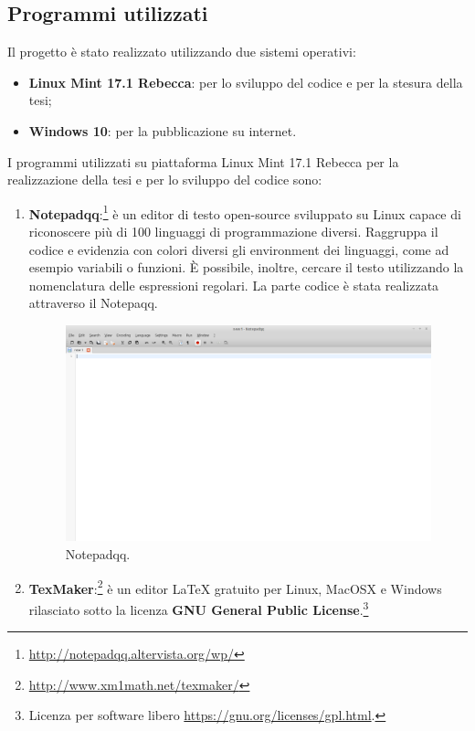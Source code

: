 \documentclass[a4paper,11pt]{article}
\begin{document}
\subsection{Programmi utilizzati}
\label{sec:6.1}
Il progetto è stato realizzato utilizzando due sistemi operativi:
\begin{itemize}
	\item \textbf{Linux Mint 17.1 Rebecca}: per lo sviluppo del codice e per la stesura della tesi;
	\item \textbf{Windows 10}: per la pubblicazione su internet.
\end{itemize}
I programmi utilizzati su piattaforma Linux Mint 17.1 Rebecca per la realizzazione della tesi e per lo sviluppo del codice sono:
\begin{enumerate}
	\item \textbf{Notepadqq}:\footnote{\url{http://notepadqq.altervista.org/wp/}} è un editor di testo open-source sviluppato su Linux capace di riconoscere più di 100 linguaggi di programmazione diversi. Raggruppa il codice e evidenzia con colori diversi gli environment dei linguaggi, come ad esempio variabili o funzioni.
È possibile, inoltre, cercare il testo utilizzando la nomenclatura delle espressioni regolari. 
La parte codice è stata realizzata attraverso il Notepaqq.
\begin{figure}[htpb]
	\centering
	\includegraphics[scale=0.30]{notepadqq.png}
	\caption{Notepadqq.}
	\label{fig:10}
\end{figure}
\newpage
		\item	\textbf{TexMaker}:\footnote{\url{http://www.xm1math.net/texmaker/}} è un editor LaTeX gratuito  per Linux, MacOSX e Windows rilasciato sotto la licenza \textbf{GNU General Public License}.\footnote{Licenza per software libero \url{https://gnu.org/licenses/gpl.html}.}

\end{enumerate}
\end{document}
